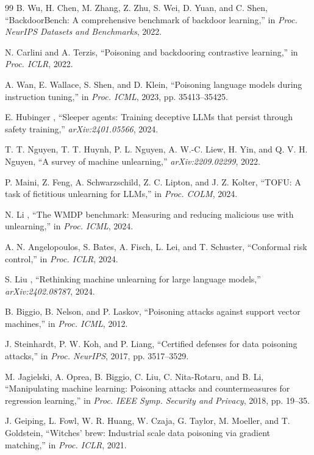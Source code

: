 \begin{thebibliography}{99}
B. Wu, H. Chen, M. Zhang, Z. Zhu, S. Wei, D. Yuan, and C. Shen, ``BackdoorBench: A comprehensive benchmark of backdoor learning,'' in \emph{Proc. NeurIPS Datasets and Benchmarks}, 2022.

N. Carlini and A. Terzis, ``Poisoning and backdooring contrastive learning,'' in \emph{Proc. ICLR}, 2022.

A. Wan, E. Wallace, S. Shen, and D. Klein, ``Poisoning language models during instruction tuning,'' in \emph{Proc. ICML}, 2023, pp. 35413--35425.

E. Hubinger \etal, ``Sleeper agents: Training deceptive LLMs that persist through safety training,'' \emph{arXiv:2401.05566}, 2024.

T. T. Nguyen, T. T. Huynh, P. L. Nguyen, A. W.-C. Liew, H. Yin, and Q. V. H. Nguyen, ``A survey of machine unlearning,'' \emph{arXiv:2209.02299}, 2022.

P. Maini, Z. Feng, A. Schwarzschild, Z. C. Lipton, and J. Z. Kolter, ``TOFU: A task of fictitious unlearning for LLMs,'' in \emph{Proc. COLM}, 2024.

N. Li \etal, ``The WMDP benchmark: Measuring and reducing malicious use with unlearning,'' in \emph{Proc. ICML}, 2024.

A. N. Angelopoulos, S. Bates, A. Fisch, L. Lei, and T. Schuster, ``Conformal risk control,'' in \emph{Proc. ICLR}, 2024.

S. Liu \etal, ``Rethinking machine unlearning for large language models,'' \emph{arXiv:2402.08787}, 2024.

B. Biggio, B. Nelson, and P. Laskov, ``Poisoning attacks against support vector machines,'' in \emph{Proc. ICML}, 2012.

J. Steinhardt, P. W. Koh, and P. Liang, ``Certified defenses for data poisoning attacks,'' in \emph{Proc. NeurIPS}, 2017, pp. 3517--3529.

M. Jagielski, A. Oprea, B. Biggio, C. Liu, C. Nita-Rotaru, and B. Li, ``Manipulating machine learning: Poisoning attacks and countermeasures for regression learning,'' in \emph{Proc. IEEE Symp. Security and Privacy}, 2018, pp. 19--35.

J. Geiping, L. Fowl, W. R. Huang, W. Czaja, G. Taylor, M. Moeller, and T. Goldstein, ``Witches' brew: Industrial scale data poisoning via gradient matching,'' in \emph{Proc. ICLR}, 2021.


\end{thebibliography}
